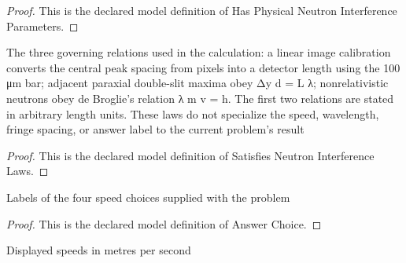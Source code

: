 \begin{proof}
  This is the declared model definition of Has Physical Neutron Interference Parameters.
\end{proof}
\begin{definition}
  \label{def:physics:phyx-mini-0500:phyxminiproblems-problemphyxmini0500-satisfiesneutroninterferencelaws}
  The three governing relations used in the calculation: a linear image calibration converts the central peak spacing from pixels into a detector length using the 100 μm bar; adjacent paraxial double-slit maxima obey Δy d = L λ; nonrelativistic neutrons obey de Broglie's relation λ m v = h. The first two relations are stated in arbitrary length units. These laws do not specialize the speed, wavelength, fringe spacing, or answer label to the current problem's result
\end{definition}
\begin{proof}
  This is the declared model definition of Satisfies Neutron Interference Laws.
\end{proof}
\begin{definition}
  \label{def:physics:phyx-mini-0500:phyxminiproblems-problemphyxmini0500-answerchoice}
  Labels of the four speed choices supplied with the problem
\end{definition}
\begin{proof}
  This is the declared model definition of Answer Choice.
\end{proof}
\begin{definition}
  \label{def:physics:phyx-mini-0500:phyxminiproblems-problemphyxmini0500-displayedspeedinmeterspersecond}
  Displayed speeds in metres per second
\end{definition}
